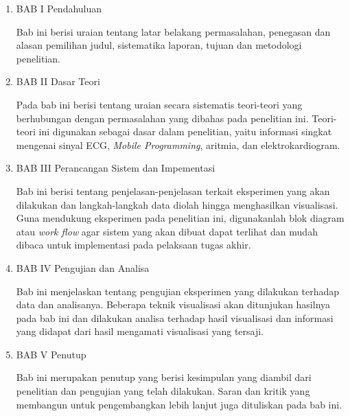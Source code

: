\begin{enumerate}[nolistsep]
	\item BAB I Pendahuluan

	Bab ini berisi uraian tentang latar belakang permasalahan, penegasan dan alasan pemilihan judul, sistematika laporan, tujuan dan metodologi penelitian.
	\vspace{1ex}

	\item BAB II Dasar Teori

	Pada bab ini berisi tentang uraian secara sistematis teori-teori yang berhubungan dengan permasalahan yang dibahas pada penelitian ini. Teori-teori ini digunakan sebagai dasar dalam penelitian, yaitu informasi singkat mengenai sinyal ECG, \textit{Mobile Programming}, aritmia, dan elektrokardiogram.
	\vspace{1ex}

	\item BAB III Perancangan Sistem dan Impementasi

	Bab ini berisi tentang penjelasan-penjelasan terkait eksperimen yang akan dilakukan dan langkah-langkah data diolah hingga menghasilkan visualisasi. Guna mendukung eksperimen pada penelitian ini, digunakanlah blok diagram atau \textit{work flow} agar sistem yang akan dibuat dapat terlihat dan mudah dibaca untuk implementasi pada pelaksaan tugas akhir.
	\vspace{1ex}

	\item BAB IV Pengujian dan Analisa

	Bab ini menjelaskan tentang pengujian eksperimen yang dilakukan terhadap data dan analisanya. Beberapa teknik visualisasi akan ditunjukan hasilnya pada bab ini dan dilakukan analisa terhadap hasil visualisasi dan informasi yang didapat dari hasil mengamati visualisasi yang tersaji.
	\vspace{1ex}

	\item BAB V Penutup

	Bab ini merupakan penutup yang berisi kesimpulan yang diambil dari penelitian dan pengujian yang telah dilakukan. Saran dan kritik yang membangun untuk pengembangkan lebih lanjut juga dituliskan pada bab ini.
\end{enumerate}
\vspace{1ex}